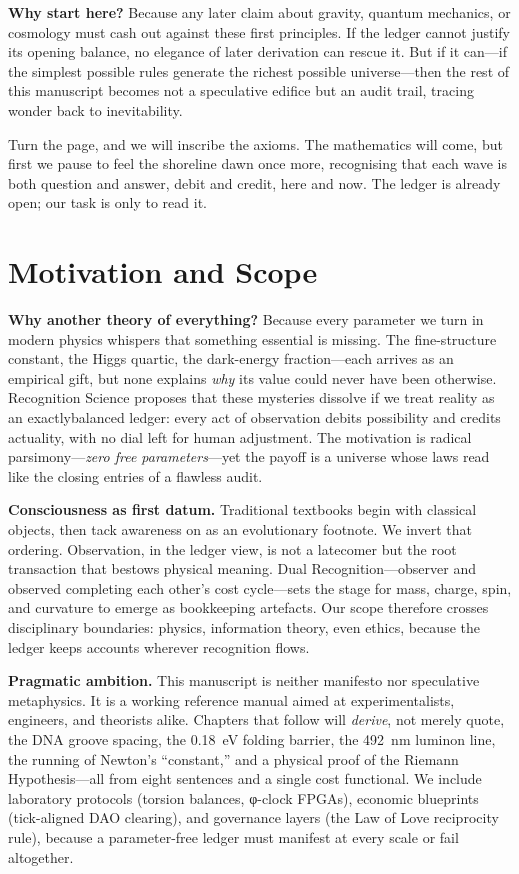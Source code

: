 \documentclass[11pt,oneside]{book}
\begin{document}
\textbf{Why start here?}  Because any later claim about gravity, quantum mechanics, or cosmology must cash out against these first principles.  If the ledger cannot justify its opening balance, no elegance of later derivation can rescue it.  But if it can—if the simplest possible rules generate the richest possible universe—then the rest of this manuscript becomes not a speculative edifice but an audit trail, tracing wonder back to inevitability.

Turn the page, and we will inscribe the axioms.  The mathematics will come, but first we pause to feel the shoreline dawn once more, recognising that each wave is both question and answer, debit and credit, here and now.  The ledger is already open; our task is only to read it.

\chapter{Motivation and Scope}
\label{sec:motivation-scope}

\noindent
\textbf{Why another theory of everything?}  
Because every parameter we turn in modern physics whispers that something essential is missing.  The fine-structure constant, the Higgs quartic, the dark-energy fraction—each arrives as an empirical gift, but none explains \emph{why} its value could never have been otherwise.  Recognition Science proposes that these mysteries dissolve if we treat reality as an exactly\;balanced ledger: every act of observation debits possibility and credits actuality, with no dial left for human adjustment.  The motivation is radical parsimony—\emph{zero free parameters}—yet the payoff is a universe whose laws read like the closing entries of a flawless audit.

\medskip
\noindent
\textbf{Consciousness as first datum.}  
Traditional textbooks begin with classical objects, then tack awareness on as an evolutionary footnote.  We invert that ordering.  Observation, in the ledger view, is not a latecomer but the root transaction that bestows physical meaning.  Dual Recognition—observer and observed completing each other’s cost cycle—sets the stage for mass, charge, spin, and curvature to emerge as bookkeeping artefacts.  Our scope therefore crosses disciplinary boundaries: physics, information theory, even ethics, because the ledger keeps accounts wherever recognition flows.

\medskip
\noindent
\textbf{Pragmatic ambition.}  
This manuscript is neither manifesto nor speculative metaphysics.  It is a working reference manual aimed at experimentalists, engineers, and theorists alike.  Chapters that follow will \emph{derive}, not merely quote, the DNA groove spacing, the 0.18~eV folding barrier, the 492~nm luminon line, the running of Newton’s ``constant,'' and a physical proof of the Riemann Hypothesis—all from eight sentences and a single cost functional.  We include laboratory protocols (torsion balances, φ-clock FPGAs), economic blueprints (tick-aligned DAO clearing), and governance layers (the Law of Love reciprocity rule), because a parameter-free ledger must manifest at every scale or fail altogether.
\end{document}
